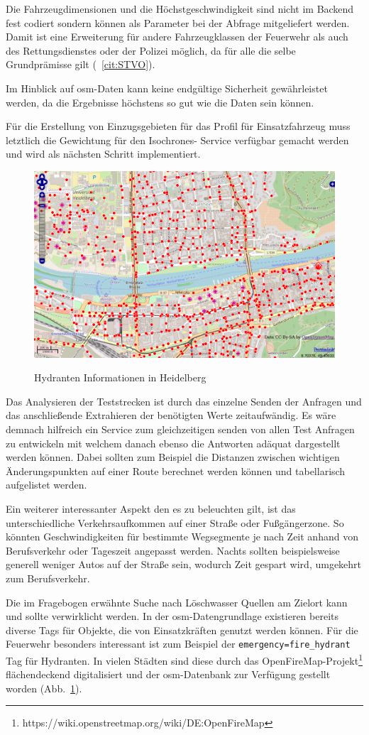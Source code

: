Die Fahrzeugdimensionen und die Höchstgeschwindigkeit sind nicht im Backend fest codiert sondern können als Parameter bei der Abfrage mitgeliefert werden.
Damit ist eine Erweiterung für andere Fahrzeugklassen der Feuerwehr als auch des Rettungsdienstes oder der Polizei möglich, da für alle die selbe Grundprämisse gilt (~\ref{cit:STVO}).

Im Hinblick auf \gls{osm}-Daten kann keine endgültige Sicherheit gewährleistet werden, da die Ergebnisse höchstens so gut wie die Daten sein können.

Für die Erstellung von Einzugsgebieten für das Profil für Einsatzfahrzeug  muss letztlich die Gewichtung für den Isochrones- Service verfügbar gemacht werden und wird als nächsten Schritt implementiert.

\begin{figure}[htb]
\centering
\caption{Hydranten Informationen in Heidelberg}
\label{fig:firehydrants}
\includegraphics[width = 0.80 \textwidth]{../media/firehydrants.png} \\
\end{figure}

Das Analysieren der Teststrecken ist durch das einzelne Senden der Anfragen und das anschließende Extrahieren der benötigten Werte zeitaufwändig.
Es wäre demnach hilfreich ein Service zum gleichzeitigen senden von allen Test Anfragen zu entwickeln mit welchem danach ebenso die Antworten adäquat dargestellt werden können.
Dabei sollten zum Beispiel die Distanzen zwischen wichtigen Änderungspunkten auf einer Route berechnet werden können und tabellarisch aufgelistet werden.

Ein weiterer interessanter Aspekt den es zu beleuchten gilt, ist das unterschiedliche Verkehrsaufkommen auf einer Straße oder Fußgängerzone.
So könnten Geschwindigkeiten für bestimmte Wegsegmente je nach Zeit anhand von Berufsverkehr oder Tageszeit angepasst werden.
Nachts sollten beispielsweise generell weniger Autos auf der Straße sein, wodurch Zeit gespart wird, umgekehrt zum Berufsverkehr.

Die im Fragebogen erwähnte Suche nach Löschwasser Quellen am Zielort kann und sollte verwirklicht werden.
In der \gls{osm}-Datengrundlage existieren bereits diverse Tags für Objekte, die von Einsatzkräften genutzt werden können.
Für die Feuerwehr besonders interessant ist zum Beispiel der \texttt{emergency=fire\_hydrant} Tag für Hydranten.
In vielen Städten sind diese durch das OpenFireMap-Projekt\footnote{https://wiki.openstreetmap.org/wiki/DE:OpenFireMap} flächendeckend digitalisiert und der \gls{osm}-Datenbank zur Verfügung gestellt worden (Abb.~\ref{fig:firehydrants}).